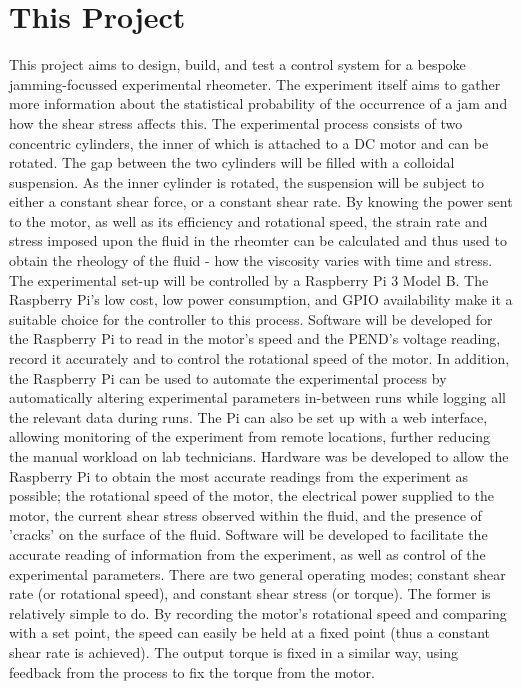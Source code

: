 \documentclass[twoside,a4]{report}
\def\br{\newline \newline \noindent}
\begin{document}
	\section{This Project} %
	This project aims to design, build, and test a control system for a bespoke jamming-focussed experimental rheometer. The experiment itself aims to gather more information about the statistical probability of the occurrence of a jam and how the shear stress affects this. \br
	The experimental process consists of two concentric cylinders, the inner of which is attached to a DC motor and can be rotated. The gap between the two cylinders will be filled with a colloidal suspension. As the inner cylinder is rotated, the suspension will be subject to either a constant shear force, or a constant shear rate. 
	By knowing the power sent to the motor, as well as its efficiency and rotational speed, the strain rate and stress imposed upon the fluid in the rheomter can be calculated and thus used to obtain the rheology of the fluid - how the viscosity varies with time and stress. \br
	The experimental set-up will be controlled by a Raspberry Pi 3 Model B. The Raspberry Pi's low cost, low power consumption, and GPIO availability make it a suitable choice for the controller to this process. Software will be developed for the Raspberry Pi to read in the motor's speed and the PEND's voltage reading, record it accurately and to control the rotational speed of the motor. In addition, the Raspberry Pi can be used to automate the experimental process by automatically altering experimental parameters in-between runs while logging all the relevant data during runs. The Pi can also be set up with a web interface, allowing monitoring of the experiment from remote locations, further reducing the manual workload on lab technicians. \br
	Hardware was be developed to allow the Raspberry Pi to obtain the most accurate readings from the experiment as possible; the rotational speed of the motor, the electrical power supplied to the motor, the current shear stress observed within the fluid, and the presence of 'cracks' on the surface of the fluid.\br
	Software will be developed to facilitate the accurate reading of information from the experiment, as well as control of the experimental parameters. There are two general operating modes; constant shear rate (or rotational speed), and constant shear stress (or torque). The former is relatively simple to do. By recording the motor's rotational speed and comparing with a set point, the speed can easily be held at a fixed point (thus a constant shear rate is achieved). The output torque is fixed in a similar way, using feedback from the process to fix the torque from the motor.
\end{document}
